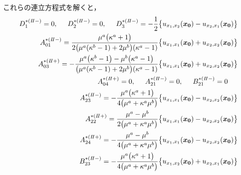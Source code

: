 これらの連立方程式を解くと，
\begin{align}
	D_{1}^{*(I\hspace{-.15em}I-)}=0,\hspace{0.5cm}D_{2}^{*(I\hspace{-.15em}I-)}=0,
	\hspace{0.5cm}D_{3}^{*(I\hspace{-.15em}I-)}=-\frac{1}{2}\bigl\{u_{x_{1},x_{2}}(\bm{x_{0}})-u_{x_{2},x_{1}}(\bm{x_{0}})\bigr\}&
	\nonumber
	\\
	A_{01}^{*(I\hspace{-.15em}I-)}=\frac{\mu^{a}\bigl(\kappa^{a}+1\bigr)}{2\bigl(\mu^{a}(\kappa^{b}-1)+2\mu^{b}\bigr)(\kappa^{a}-1)}
	\bigl\{u_{x_{1},x_{1}}(\bm{x_{0}})+u_{x_{2},x_{2}}(\bm{x_{0}})\bigr\}&
	\nonumber
	\\
	A_{03}^{*(I\hspace{-.15em}I+)}=-\frac{\mu^{a}\bigl(\kappa^{b}-1\bigr)-\mu^{b}\bigl(\kappa^{a}-1\bigr)}{\bigl(\mu^{a}(\kappa^{b}-1)+2\mu^{b}\bigr)(\kappa^{a}-1)}
	\bigl\{u_{x_{1},x_{1}}(\bm{x_{0}})+u_{x_{2},x_{2}}(\bm{x_{0}})\bigr\}&
	\nonumber
	\\
	A_{04}^{*(I\hspace{-.15em}I+)}=0,\hspace{0.5cm} A_{21}^{*(I\hspace{-.15em}I-)}=0,\hspace{0.5cm} B_{21}^{*(I\hspace{-.15em}I-)}=0\hspace{0.5cm}&
	\nonumber
	\\
	A_{23}^{*(I\hspace{-.15em}I-)}=-\frac{\mu^{a}\bigl(\kappa^{a}+1\bigr)}{4\bigl(\mu^{a}+\kappa^{a}\mu^{b}\bigr)}
	\bigl\{u_{x_{1},x_{1}}(\bm{x_{0}})-u_{x_{2},x_{2}}(\bm{x_{0}})\bigr\}&
	\nonumber
	\\
	A_{22}^{*(I\hspace{-.15em}I+)}=\frac{\mu^{a}-\mu^{b}}{2\bigl(\mu^{a}+\kappa^{a}\mu^{b}\bigr)}
	\bigl\{u_{x_{1},x_{1}}(\bm{x_{0}})-u_{x_{2},x_{2}}(\bm{x_{0}})\bigr\}&
	\nonumber\\
	A_{24}^{*(I\hspace{-.15em}I+)}=-\frac{\mu^{a}-\mu^{b}}{4\bigl(\mu^{a}+\kappa^{a}\mu^{b}\bigr)}
	\bigl\{u_{x_{1},x_{1}}(\bm{x_{0}})-u_{x_{2},x_{2}}(\bm{x_{0}})\bigr\}&
	\nonumber
	\\
	B_{23}^{*(I\hspace{-.15em}I-)}=-\frac{\mu^{a}\bigl(\kappa^{a}+1\bigr)}{4\bigl(\mu^{a}+\kappa^{a}\mu^{b}\bigr)}
	\bigl\{u_{x_{1},x_{2}}(\bm{x_{0}})+u_{x_{2},x_{1}}(\bm{x_{0}})\bigr\}&

\end{align}
